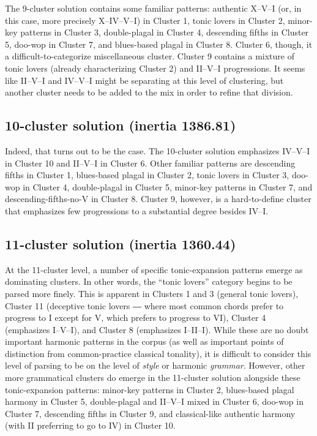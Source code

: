 The 9-cluster solution contains some familiar patterns: authentic X–V–I (or, in this case, more precisely X–IV–V–I) in Cluster 1, tonic lovers in Cluster 2, minor-key patterns in Cluster 3, double-plagal in Cluster 4, descending fifths in Cluster 5, doo-wop in Cluster 7, and blues-based plagal in Cluster 8. Cluster 6, though, it a difficult-to-categorize miscellaneous cluster. Cluster 9 contains a mixture of tonic lovers (already characterizing Cluster 2) and II–V–I progressions. It seems like II–V–I and IV–V–I might be separating at this level of clustering, but another cluster needs to be added to the mix in order to refine that division.

\subsection{10-cluster solution (inertia 1386.81)}
\label{10-clustersolutioninertia1386.81}

Indeed, that turns out to be the case. The 10-cluster solution emphasizes IV–V–I in Cluster 10 and II–V–I in Cluster 6. Other familiar patterns are descending fifths in Cluster 1, blues-based plagal in Cluster 2, tonic lovers in Cluster 3, doo-wop in Cluster 4, double-plagal in Cluster 5, minor-key patterns in Cluster 7, and descending-fifths-no-V in Cluster 8. Cluster 9, however, is a hard-to-define cluster that emphasizes few progressions to a substantial degree besides IV–I.

\subsection{11-cluster solution (inertia 1360.44)}
\label{11-clustersolutioninertia1360.44}

At the 11-cluster level, a number of specific tonic-expansion patterns emerge as dominating clusters. In other words, the ``tonic lovers'' category begins to be parsed more finely. This is apparent in Clusters 1 and 3 (general tonic lovers), Cluster 11 (deceptive tonic lovers ― where most common chords prefer to progress to I except for V, which prefers to progress to VI), Cluster 4 (emphasizes I–V–I), and Cluster 8 (emphasizes I–II–I). While these are no doubt important harmonic patterns in the corpus (as well as important points of distinction from common-practice classical tonality), it is difficult to consider this level of parsing to be on the level of \emph{style} or harmonic \emph{grammar}. However, other more grammatical clusters do emerge in the 11-cluster solution alongside these tonic-expansion patterns: minor-key patterns in Cluster 2, blues-based plagal harmony in Cluster 5, double-plagal and II–V–I mixed in Cluster 6, doo-wop in Cluster 7, descending fifths in Cluster 9, and classical-like authentic harmony (with II preferring to go to IV) in Cluster 10.

